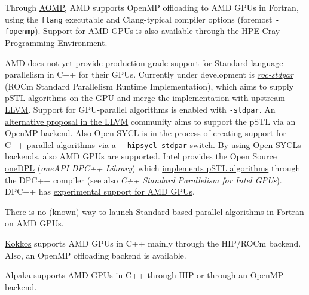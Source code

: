  Through \href{https://github.com/ROCm-Developer-Tools/aomp}{AOMP}, AMD supports OpenMP offloading to AMD GPUs in Fortran, using the \texttt{flang} executable and Clang-typical compiler options (foremost \texttt{-fopenmp}). Support for AMD GPUs is also available through the \href{https://cpe.ext.hpe.com/docs/cce/man7/intro_openmp.7.html}{HPE Cray Programming Environment}.   

 AMD does not yet provide production-grade support for Standard-language parallelism in C++ for their GPUs. Currently under development is \href{https://github.com/ROCmSoftwarePlatform/roc-stdpar}{\emph{roc-stdpar}} (ROCm Standard Parallelism Runtime Implementation), which aims to supply pSTL algorithms on the GPU and \href{https://discourse.llvm.org/t/rfc-adding-c-parallel-algorithm-offload-support-to-clang-llvm/72159}{merge the implementation with upstream LLVM}. Support for GPU-parallel algorithms is enabled with \texttt{-stdpar}. An \href{https://discourse.llvm.org/t/rfc-openmp-offloading-backend-for-c-parallel-algorithms/73468}{alternative proposal in the LLVM} community aims to support the pSTL via an OpenMP backend. Also Open SYCL \href{https://github.com/OpenSYCL/OpenSYCL/pull/1088}{is in the process of creating support for C++ parallel algorithms} via a \texttt{-\/-hipsycl-stdpar} switch. By using Open SYCL\textquotesingle s backends, also AMD GPUs are supported. Intel provides the Open Source \href{https://github.com/oneapi-src/oneDPL}{oneDPL} (\emph{oneAPI DPC++ Library}) which \href{https://oneapi-src.github.io/oneDPL/parallel_api_main.html}{implements pSTL algorithms} through the DPC++ compiler (see also \emph{C++ Standard Parallelism for Intel GPUs}). DPC++ has \href{https://intel.github.io/llvm-docs/GetStartedGuide.html\#build-dpc-toolchain-with-support-for-hip-amd}{experimental support for AMD GPUs}.   

 There is no (known) way to launch Standard-based parallel algorithms in Fortran on AMD GPUs. 

 \href{https://github.com/kokkos/kokkos}{Kokkos} supports AMD GPUs in C++ mainly through the HIP/ROCm backend. Also, an OpenMP offloading backend is available.   

 \href{https://github.com/alpaka-group/alpaka}{Alpaka} supports AMD GPUs in C++ through HIP or through an OpenMP backend.   

